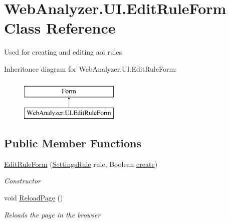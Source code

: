 \hypertarget{class_web_analyzer_1_1_u_i_1_1_edit_rule_form}{}\section{Web\+Analyzer.\+U\+I.\+Edit\+Rule\+Form Class Reference}
\label{class_web_analyzer_1_1_u_i_1_1_edit_rule_form}


Used for creating and editing aoi rules  


Inheritance diagram for Web\+Analyzer.\+U\+I.\+Edit\+Rule\+Form\+:\begin{figure}[H]
\begin{center}
\leavevmode
\includegraphics[height=2.000000cm]{class_web_analyzer_1_1_u_i_1_1_edit_rule_form}
\end{center}
\end{figure}
\subsection*{Public Member Functions}
\begin{DoxyCompactItemize}
\item 
\hyperlink{class_web_analyzer_1_1_u_i_1_1_edit_rule_form_a808eb0a4efc018629ec1c5ce337d4533}{Edit\+Rule\+Form} (\hyperlink{class_web_analyzer_1_1_models_1_1_settings_model_1_1_settings_rule}{Settings\+Rule} rule, Boolean \hyperlink{_u_i_2_h_t_m_l_resources_2js_2lib_2underscore_8min_8js_a8bd5981157799459d39a59e8c4a0de04}{create})
\begin{DoxyCompactList}\small\item\em Constructor \end{DoxyCompactList}\item 
void \hyperlink{class_web_analyzer_1_1_u_i_1_1_edit_rule_form_ac8507e10ea396307c0519ae8e13d8378}{Reload\+Page} ()
\begin{DoxyCompactList}\small\item\em Reloads the page in the browser \end{DoxyCompactList}\end{DoxyCompactItemize}
